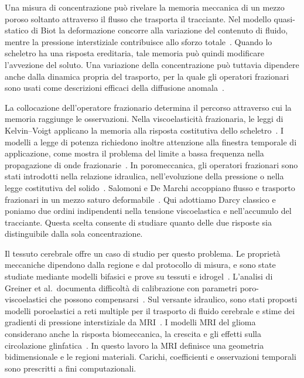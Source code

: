 Una misura di concentrazione può rivelare la memoria meccanica di un mezzo poroso soltanto attraverso il flusso che trasporta il tracciante. Nel modello quasi-statico di Biot la deformazione concorre alla variazione del contenuto di fluido, mentre la pressione interstiziale contribuisce allo sforzo totale~\citep{biot1941general,bociu2023mathematical}. Quando lo scheletro ha una risposta ereditaria, tale memoria può quindi modificare l'avvezione del soluto. Una variazione della concentrazione può tuttavia dipendere anche dalla dinamica propria del trasporto, per la quale gli operatori frazionari sono usati come descrizioni efficaci della diffusione anomala~\citep{metzler2000the,magin2008anomalous,zhou2010studies}.

La collocazione dell'operatore frazionario determina il percorso attraverso cui la memoria raggiunge le osservazioni. Nella viscoelasticità frazionaria, le leggi di Kelvin--Voigt applicano la memoria alla risposta costitutiva dello scheletro~\citep{caponi2021sapio,libertiaux2010differential,failla2020advanced}. I modelli a legge di potenza richiedono inoltre attenzione alla finestra temporale di applicazione, come mostra il problema del limite a bassa frequenza nella propagazione di onde frazionarie~\citep{holm2023adding}. In poromeccanica, gli operatori frazionari sono stati introdotti nella relazione idraulica, nell'evoluzione della pressione o nella legge costitutiva del solido~\citep{alaimo2019a,barrera2021unified,tyrylgin2023computational,amiri2023fractionalorder}. Salomoni e De Marchi accoppiano flusso e trasporto frazionari in un mezzo saturo deformabile~\citep{salomoni2022fractional}. Qui adottiamo Darcy classico e poniamo due ordini indipendenti nella tensione viscoelastica e nell'accumulo del tracciante. Questa scelta consente di studiare quanto delle due risposte sia distinguibile dalla sola concentrazione.

Il tessuto cerebrale offre un caso di studio per questo problema. Le proprietà meccaniche dipendono dalla regione e dal protocollo di misura, e sono state studiate mediante modelli bifasici e prove su tessuti e idrogel~\citep{budday2019fifty,mehrabian2015dual,comellas2020modeling,kainz2023poroviscoelastic}. L'analisi di Greiner et al.\ documenta difficoltà di calibrazione con parametri poro-viscoelastici che possono compensarsi~\citep{greiner2024modeldriven}. Sul versante idraulico, sono stati proposti modelli poroelastici a reti multiple per il trasporto di fluido cerebrale e stime dei gradienti di pressione interstiziale da MRI~\citep{guo2020a,mcgarry2025pgmri}. I modelli MRI del glioma considerano anche la risposta biomeccanica, la crescita e gli effetti sulla circolazione glinfatica~\citep{angeli2016biphasic,andaloussi2026an,poulain2026glioma}. In questo lavoro la MRI definisce una geometria bidimensionale e le regioni materiali. Carichi, coefficienti e osservazioni temporali sono prescritti a fini computazionali.

